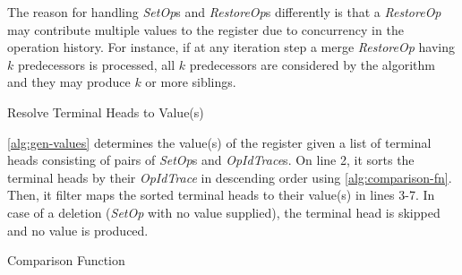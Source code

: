 \documentclass[sigplan,natbib=false,review]{acmart}
\newcommand{\setopkind}{\textit{SetOp}}
\newcommand{\restopkind}{\textit{RestoreOp}}
\newcommand{\opidtrace}{\textit{OpIdTrace}}
\begin{document}
The reason for handling \setopkind{}s and \restopkind{}s differently 
is that a \restopkind{} may contribute multiple values to
the register due to concurrency in the operation history.
For instance, if at any iteration step a merge \restopkind{} having $k$
predecessors is processed, all $k$ predecessors are considered by the algorithm
and they may produce $k$ or more siblings.

\begin{algorithm}
  \caption{Resolve Terminal Heads to Value(s)}\label{alg:gen-values}
  \begin{algorithmic}[1]
          \EndIf{}
        \EndFor{}
    \EndFunction{}
  \end{algorithmic}
\end{algorithm}

\autoref{alg:gen-values} determines the value(s) of the register
given a list of terminal heads consisting of pairs of \setopkind{}s and
\opidtrace{}s.
On line 2, it sorts the terminal heads by their \opidtrace{}
in descending order using \cref{alg:comparison-fn}.
Then, it filter maps the sorted terminal heads to their value(s) in lines 3-7.
In case of a deletion (\setopkind{} with no value supplied),
the terminal head is skipped and no value is produced.

\begin{algorithm}
  \caption{Comparison Function}\label{alg:comparison-fn}
  \begin{algorithmic}[1]
        \EndIf{}
      \EndFor{}
    \EndFunction{}
  \end{algorithmic}
\end{algorithm}
\end{document}
